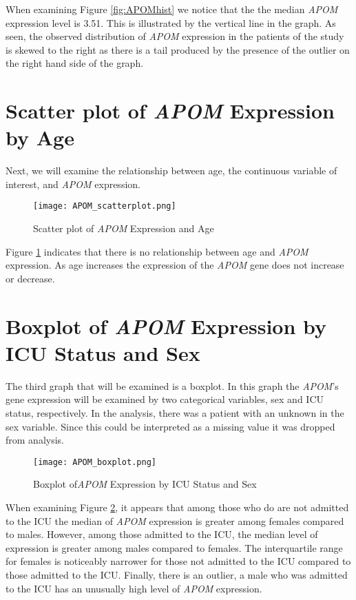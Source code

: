 \documentclass{article}
\begin{document}
\noindent When examining Figure \ref{fig:APOMhist} we notice that the the median \emph{APOM} expression level is 3.51. This is illustrated by the vertical line in the graph. As seen, the observed distribution of \emph{APOM} expression in the patients of the study is skewed to the right as there is a tail produced by the presence of the outlier on the right hand side of the graph.  
\newpage
\section{Scatter plot of \emph{APOM} Expression by Age}
Next, we will examine the relationship between age, the continuous variable of interest, and \emph{APOM} expression.
\begin{figure}[h]
    \centering
    \texttt{[image: APOM\_scatterplot.png]}
    \caption{Scatter plot of \emph{APOM} Expression and Age}
    \label{fig:scatter}
\end{figure}

Figure \ref{fig:scatter} indicates that there is no relationship between age and \emph{APOM} expression. As age increases the expression of the \emph{APOM} gene does not increase or decrease. 

\section{Boxplot of \emph{APOM} Expression by ICU Status and Sex}
The third graph that will be examined is a boxplot. In this graph the \emph{APOM}'s gene expression will be examined by two categorical variables, sex and ICU status, respectively. In the analysis, there was a patient with an unknown in the sex variable. Since this could be interpreted as a missing value it was dropped from analysis. 
\newpage
\begin{figure}[h]
    \centering
    \texttt{[image: APOM\_boxplot.png]}
    \caption{Boxplot of\emph{APOM} Expression by ICU Status and Sex}
    \label{fig:boxplot}
\end{figure}


When examining Figure \ref{fig:boxplot}, it appears that among those who do are not admitted to the ICU the median of \emph{APOM} expression is greater among females compared to males. However, among those admitted to the ICU, the median level of expression is greater among males compared to females. The interquartile range for females is noticeably narrower for those not admitted to the ICU compared to those admitted to the ICU. Finally, there is an outlier, a male who was admitted to the ICU has an unusually high level of \emph{APOM} expression.
\end{document}
